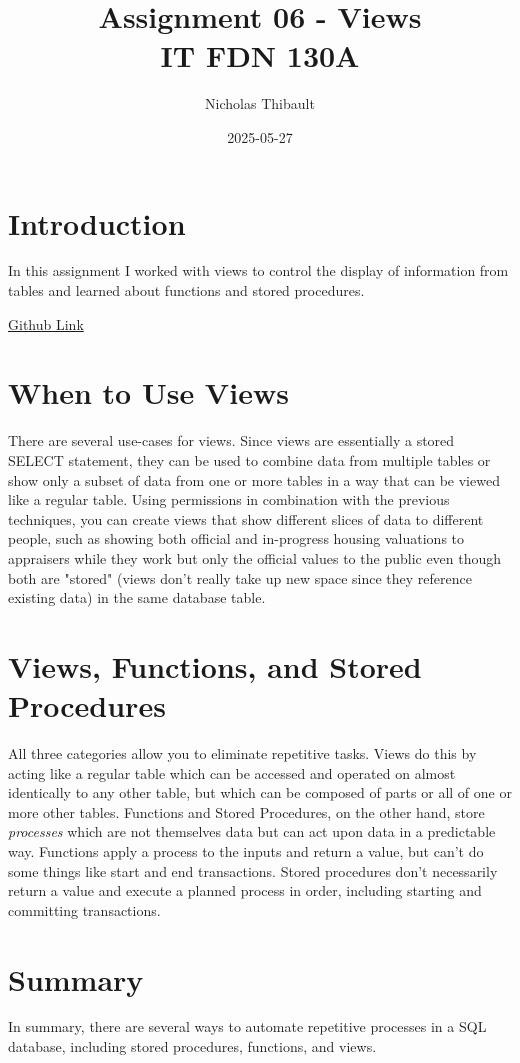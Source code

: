 \documentclass{article}
\title{Assignment 06 - Views \\
\large{IT FDN 130A}}
\author{Nicholas Thibault}
\date{2025-05-27}
\begin{document}
\maketitle

\section*{Introduction}
In this assignment I worked with views to control the display of information from tables and learned about functions and stored procedures.

\href{https://github.com/Dilong-paradoxus/DBFoundations/}{Github Link}
\section*{When to Use Views}
There are several use-cases for views.\cite{SQLviewW3} Since views are essentially a stored SELECT statement, they can be used to combine data from multiple tables or show only a subset of data from one or more tables in a way that can be viewed like a regular table. Using permissions in combination with the previous techniques, you can create views that show different slices of data to different people, such as showing both official and in-progress housing valuations to appraisers while they work but only the official values to the public even though both are "stored" (views don't really take up new space since they reference existing data) in the same database table. 
\section*{Views, Functions, and Stored Procedures}
All three categories allow you to eliminate repetitive tasks. Views do this by acting like a regular table which can be accessed and operated on almost identically to any other table, but which can be composed of parts or all of one or more other tables.\cite{SQLviewW3} Functions\cite{SQLFunctionsW3} and Stored Procedures,\cite{SQLstoredprocW3} on the other hand, store \emph{processes} which are not themselves data but can act upon data in a predictable way. Functions apply a process to the inputs and return a value, but can't do some things like start and end transactions. Stored procedures don't necessarily return a value and execute a planned process in order, including starting and committing transactions. 
\section*{Summary}
In summary, there are several ways to automate repetitive processes in a SQL database, including stored procedures, functions, and views. 
\printbibliography
\end{document}
